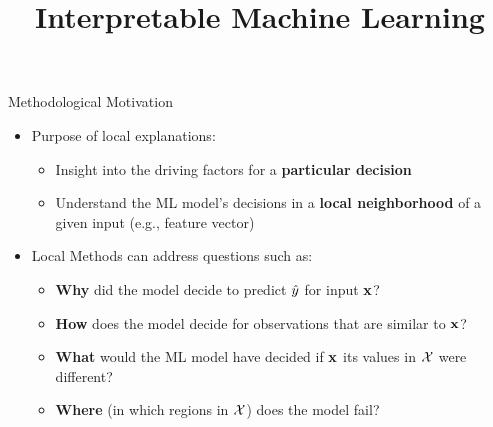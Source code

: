 \documentclass[11pt,compress,t,notes=noshow, aspectratio=169, xcolor=table]{beamer}
\title{Interpretable Machine Learning}
\date{}
\begin{document}



 \newcommand{\titlefigure}{figure/lime.png}
\newcommand{\learninggoals}{
\item Understand motivation for local explanations 
\item Develop an intuition for possible use-cases
\item Know characteristics of local explanation methods}



\begin{vbframe}[c]{Methodological Motivation}


	\begin{itemize}
	    \item Purpose of local explanations:
	    \begin{itemize}
	        \item Insight into the driving factors for a \textbf{particular decision}
	        \item Understand the ML model's decisions in a \textbf{local neighborhood} of a given input (e.g., feature vector)
	    \end{itemize}
	    \medskip
	    \pause
		\item Local Methods can address questions such as: 
		\begin{itemize}
		    \item \textbf{Why} did the model decide to predict $\yh$ for input $\xv$?
		    \item \textbf{How} does the model decide for observations that are similar to $\xv$?
		    \item \textbf{What} would the ML model have decided if $\xv$ its values in $\Xspace$ were different?
		    \item  \textbf{Where} (in which regions in $\Xspace$) does the model fail?
		\end{itemize}  
	\end{itemize}
\end{vbframe}
\end{document}

